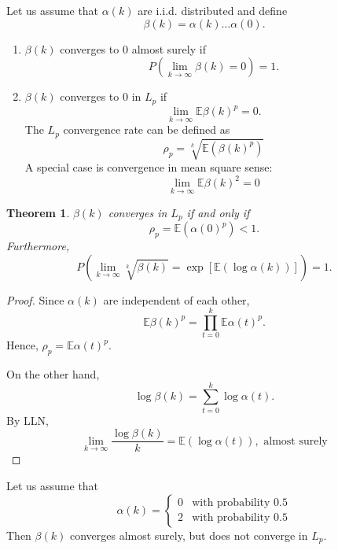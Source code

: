 \documentclass{article}
\newtheorem{theorem}{Theorem}
\begin{document}
Let us assume that $\alpha(k)$ are i.i.d. distributed and define
\begin{displaymath}
 \beta(k) = \alpha(k)\dots\alpha(0). 
\end{displaymath}

\begin{enumerate}
  \item $\beta(k)$ converges to $0$ almost surely if
    \begin{displaymath}
      P(\lim_{k\rightarrow\infty}\beta(k) = 0) =1 .
    \end{displaymath}
  \item $\beta(k)$ converges to $0$ in $L_p$ if
    \begin{displaymath}
      \lim_{k\rightarrow\infty}  \mathbb E\beta(k)^p = 0.
    \end{displaymath}
    The $L_p$ convergence rate can be defined as
    \begin{displaymath}
      \rho_p=\sqrt[k]{\mathbb E\left(\beta(k)^p\right)}
    \end{displaymath}
    A special case is convergence in mean square sense:
    \begin{displaymath}
      \lim_{k\rightarrow\infty} \mathbb E\beta(k)^2 = 0 
    \end{displaymath}
\end{enumerate}

\begin{theorem}
  $\beta(k)$ converges in $L_p$ if and only if 
  \begin{displaymath}
   \rho_p = \mathbb E\left(\alpha(0)^p\right) < 1.
  \end{displaymath}
  Furthermore, 
  \begin{displaymath}
    P\left( \lim_{k\rightarrow\infty} \sqrt[k]{\beta(k)} = \exp\left[\mathbb E\left( \log\alpha(k)\right)\right] \right)=1. 
  \end{displaymath}
\end{theorem}
\begin{proof}
  Since $\alpha(k)$ are independent of each other,
  \begin{displaymath}
    \mathbb E\beta(k)^p = \prod_{t=0}^k \mathbb E\alpha(t)^p. 
  \end{displaymath}
  Hence, $\rho_p = \mathbb E\alpha(t)^p$.

  On the other hand,
  \begin{displaymath}
    \log \beta(k) = \sum_{t=0}^k \log \alpha(t). 
  \end{displaymath}
  By LLN,
  \begin{displaymath}
    \lim_{k\rightarrow\infty}\frac{\log \beta(k)}{k } = \mathbb E\left( \log \alpha(t) \right),\text{ almost surely}
  \end{displaymath}
\end{proof}
Let us assume that
\begin{displaymath}
  \alpha(k) = \begin{cases}
    0&\text{with probability }0.5\\
    2&\text{with probability }0.5
  \end{cases}
\end{displaymath}
Then $\beta(k)$ converges almost surely, but does not converge in $L_p$.
\end{document}
